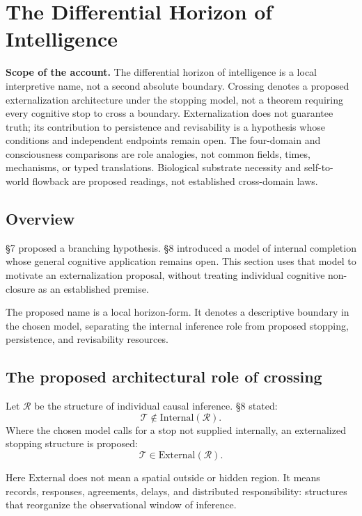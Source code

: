 \section{The Differential Horizon of Intelligence}

\noindent\textbf{Scope of the account.} The differential horizon of intelligence is a local interpretive name, not a second absolute boundary. Crossing denotes a proposed externalization architecture under the stopping model, not a theorem requiring every cognitive stop to cross a boundary. Externalization does not guarantee truth; its contribution to persistence and revisability is a hypothesis whose conditions and independent endpoints remain open. The four-domain and consciousness comparisons are role analogies, not common fields, times, mechanisms, or typed translations. Biological substrate necessity and self-to-world flowback are proposed readings, not established cross-domain laws.


\subsection{Overview}

\S{}7 proposed a branching hypothesis. \S{}8 introduced a model of internal completion whose general cognitive application remains open. This section uses that model to motivate an externalization proposal, without treating individual cognitive non-closure as an established premise.

The proposed name is a local horizon-form. It denotes a descriptive boundary in the chosen model, separating the internal inference role from proposed stopping, persistence, and revisability resources.

\subsection{The proposed architectural role of crossing}

Let \(\mathcal{R}\) be the structure of individual causal inference. \S{}8 stated:
\[
\mathcal{T}\notin \mathrm{Internal}(\mathcal{R}).
\]
Where the chosen model calls for a stop not supplied internally, an externalized stopping structure is proposed:
\[
\mathcal{T}\in \mathrm{External}(\mathcal{R}).
\]

Here \(\mathrm{External}\) does not mean a spatial outside or hidden region. It means records, responses, agreements, delays, and distributed responsibility: structures that reorganize the observational window of inference.

